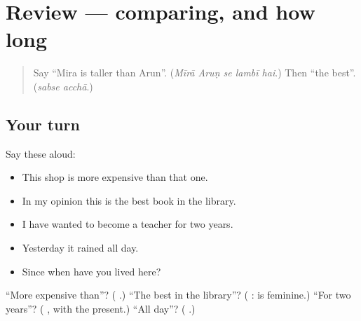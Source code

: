\section[(review)]{Review — comparing, and how long}

\label{lesson:HI-R285-comparing-and-time}



\begin{quote}
Say \textquotedblleft{}Mira is taller than Arun\textquotedblright{}. (\emph{Mīrā Aruṇ se lambī hai}.) Then \textquotedblleft{}the best\textquotedblright{}. (\emph{sabse acchā}.)
\end{quote}

\subsection*{Your turn}
Say these aloud:

\begin{itemize}
\raggedright
  \item This shop is more expensive than that one.
  \item In my opinion this is the best book in the library.
  \item I have wanted to become a teacher for two years.
  \item Yesterday it rained all day.
  \item Since when have you lived here?
\end{itemize}

\begin{tcolorbox}[breakable,colback=teal!4,colframe=teal!35!black,title={Before you move on}]
\textquotedblleft{}More expensive than\textquotedblright{}? (\textbf{  }.) \textquotedblleft{}The best in the library\textquotedblright{}? (\textbf{    }: \textbf{} is feminine.) \textquotedblleft{}For two years\textquotedblright{}? (\textbf{  }, with the present.) \textquotedblleft{}All day\textquotedblright{}? (\textbf{ }.)
\end{tcolorbox}
